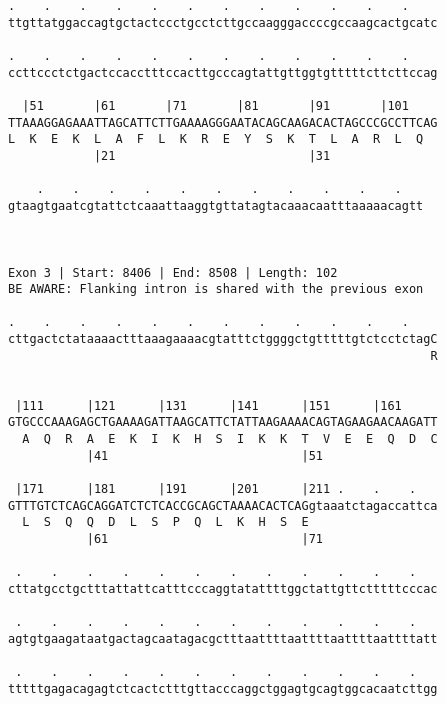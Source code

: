 \documentclass{article}
\begin{document}
\begin{Verbatim}
.    .    .    .    .    .    .    .    .    .    .    .    
ttgttatggaccagtgctactccctgcctcttgccaagggaccccgccaagcactgcatc
                                                            
.    .    .    .    .    .    .    .    .    .    .    .    
ccttccctctgactccacctttccacttgcccagtattgttggtgtttttcttcttccag
                                                            
  |51       |61       |71       |81       |91       |101    
TTAAAGGAGAAATTAGCATTCTTGAAAAGGGAATACAGCAAGACACTAGCCCGCCTTCAG
L  K  E  K  L  A  F  L  K  R  E  Y  S  K  T  L  A  R  L  Q  
            |21                           |31               
  
    .    .    .    .    .    .    .    .    .    .    .   
gtaagtgaatcgtattctcaaattaaggtgttatagtacaaacaatttaaaaacagtt
                                                          
                                                          
 
Exon 3 | Start: 8406 | End: 8508 | Length: 102
BE AWARE: Flanking intron is shared with the previous exon
 
.    .    .    .    .    .    .    .    .    .    .    .    
cttgactctataaaactttaaagaaaacgtatttctggggctgtttttgtctcctctagC
                                                           R
                                                            
  
 |111      |121      |131      |141      |151      |161     
GTGCCCAAAGAGCTGAAAAGATTAAGCATTCTATTAAGAAAACAGTAGAAGAACAAGATT
  A  Q  R  A  E  K  I  K  H  S  I  K  K  T  V  E  E  Q  D  C
           |41                           |51                
  
 |171      |181      |191      |201      |211 .    .    .   
GTTTGTCTCAGCAGGATCTCTCACCGCAGCTAAAACACTCAGgtaaatctagaccattca
  L  S  Q  Q  D  L  S  P  Q  L  K  H  S  E                  
           |61                           |71                
  
 .    .    .    .    .    .    .    .    .    .    .    .   
cttatgcctgctttattattcatttcccaggtatattttggctattgttctttttcccac
                                                            
 .    .    .    .    .    .    .    .    .    .    .    .   
agtgtgaagataatgactagcaatagacgctttaattttaattttaattttaattttatt
                                                            
 .    .    .    .    .    .    .    .    .    .    .    .   
tttttgagacagagtctcactctttgttacccaggctggagtgcagtggcacaatcttgg
                                                            

\end{Verbatim}
\end{document}
